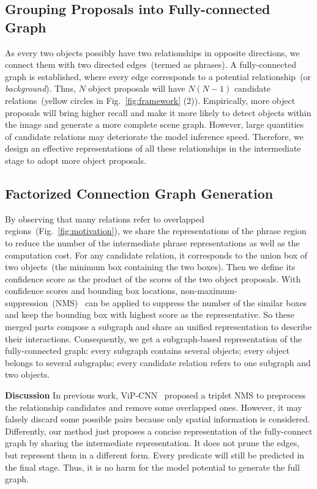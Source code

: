 \documentclass[runningheads]{llncs}
\begin{document}
\subsection{Grouping Proposals into Fully-connected Graph}
As every two objects possibly have two relationships in opposite directions, we connect them with two directed edges~(termed as phrases). A fully-connected graph is established, where every edge corresponds to a potential relationship~(or \emph{background}). Thus, $N$ object proposals will have $N(N-1)$ candidate relations~(yellow circles in Fig.~\ref{fig:framework} (2)). Empirically, more object proposals will bring higher recall and make it more likely to detect objects within the image and generate a more complete scene graph. However, large quantities of candidate relations may deteriorate the model inference speed. Therefore, we design an effective representations of all these relationships in the intermediate stage to adopt more object proposals.
  

\subsection{Factorized Connection Graph Generation}\label{sec:subgraph}
By observing that many relations refer to overlapped regions~(Fig.~\ref{fig:motivation}), we share the representations of the phrase region to reduce the number of the intermediate phrase representations as well as the computation cost. 
For any candidate relation, it corresponds to the union box of two objects~(the minimum box containing the two boxes). Then we define its confidence score as the product of the scores of the two object proposals. With confidence scores and bounding box locations, non-maximum-suppression~(NMS)~\cite{fast_rcnn} can be applied to suppress the number of the similar boxes and keep the bounding box with highest score as the representative. So these merged parts compose a subgraph and share an unified representation to describe their interactions. 
Consequently, we get a subgraph-based representation of the fully-connected graph: every subgraph contains several objects; every object belongs to several subgraphs; every candidate relation refers to one subgraph and two objects. 

\noindent\textbf{Discussion} In previous work, ViP-CNN~\cite{li2017vip} proposed a triplet NMS to preprocess the relationship candidates and remove some overlapped ones. However, it may falsely discard some possible pairs because only spatial information is considered. Differently, our method just proposes a concise representation of the fully-connect graph by sharing the intermediate representation. It does not prune the edges, but represent them in a different form. Every predicate will still be predicted in the final stage. Thus, it is no harm for the model potential to generate the full graph. 
\end{document}
